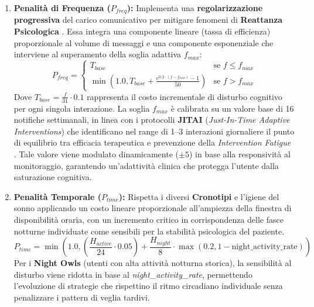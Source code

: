 \begin{enumerate}
    \item \textbf{Penalità di Frequenza ($P_{freq}$):} Implementa una \textbf{regolarizzazione progressiva} del carico comunicativo per mitigare fenomeni di \textbf{Reattanza Psicologica} \cite{brehm1966theory}. Essa integra una componente lineare (tassa di efficienza) proporzionale al volume di messaggi e una componente esponenziale che interviene al superamento della soglia adattiva $f_{max}$:
    \begin{equation}
        P_{freq} = 
        \begin{cases} 
            T_{base} & \text{se } f \leq f_{max} \\
            \min\left(1.0, T_{base} + \frac{e^{0.2 \cdot (f - f_{max})} - 1}{50}\right) & \text{se } f > f_{max}
        \end{cases}
    \end{equation}
    Dove $T_{base} = \frac{f}{31} \cdot 0.1$ rappresenta il costo incrementale di disturbo cognitivo per ogni singola interazione. La soglia $f_{max}$ è calibrata su un valore base di 16 notifiche settimanali, in linea con i protocolli \textbf{JITAI} (\textit{Just-In-Time Adaptive Interventions}) che identificano nel range di 1--3 interazioni giornaliere il punto di equilibrio tra efficacia terapeutica e prevenzione della \textit{Intervention Fatigue} \cite{nahum2018just}. Tale valore viene modulato dinamicamente ($\pm 5$) in base alla responsività al monitoraggio, garantendo un'adattività clinica che protegga l'utente dalla saturazione cognitiva.
    
    \item \textbf{Penalità Temporale ($P_{time}$):} Rispetta i diversi \textbf{Cronotipi} e l'igiene del sonno applicando un costo lineare proporzionale all'ampiezza della finestra di disponibilità oraria, con un incremento critico in corrispondenza delle fasce notturne individuate come sensibili per la stabilità psicologica del paziente.
    \begin{equation}
        P_{time} = \min\left(1.0, (\frac{H_{active}}{24} \cdot 0.05) + \frac{H_{night}}{8} \cdot \max(0.2, 1 - \text{night\_activity\_rate})\right)
    \end{equation}
    Per i \textbf{Night Owls} (utenti con alta attività notturna storica), la sensibilità al disturbo viene ridotta in base al \textit{night\_activity\_rate}, permettendo l'evoluzione di strategie che rispettino il ritmo circadiano individuale senza penalizzare i pattern di veglia tardivi.
\end{enumerate}


